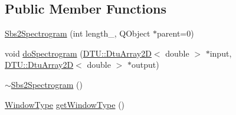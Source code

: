 \subsection*{Public Member Functions}
\begin{DoxyCompactItemize}
\item 
\hyperlink{classSbs2Spectrogram_a5093d21393080d54dd3c8ce7e198a204}{Sbs2\-Spectrogram} (int length\-\_\-, Q\-Object $\ast$parent=0)
\item 
void \hyperlink{classSbs2Spectrogram_ae2e56ca4415a47a1b52464d94a6c228b}{do\-Spectrogram} (\hyperlink{classDTU_1_1DtuArray2D}{D\-T\-U\-::\-Dtu\-Array2\-D}$<$ double $>$ $\ast$input, \hyperlink{classDTU_1_1DtuArray2D}{D\-T\-U\-::\-Dtu\-Array2\-D}$<$ double $>$ $\ast$output)
\item 
\hyperlink{classSbs2Spectrogram_a377a6b3e8f5e9414799c9104f8e5b3c8}{$\sim$\-Sbs2\-Spectrogram} ()
\item 
\hyperlink{classSbs2Spectrogram_a22265347883488b8385c83b67882d915}{Window\-Type} \hyperlink{classSbs2Spectrogram_ae46ac1ab353d0110cb121971e6cb5140}{get\-Window\-Type} ()
\end{DoxyCompactItemize}


